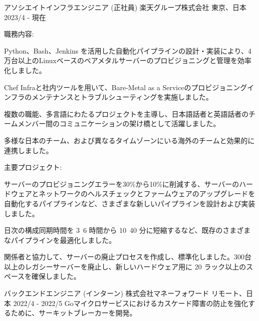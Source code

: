 

\begin{cventries}

  \cventry
    {アソシエイトインフラエンジニア (正社員)} %
    {楽天グループ株式会社} %
    {東京、日本} %
    {2023/4 - 現在} %
    {
        職務内容:
        \begin{cvbullets}
        \item Python、Bash、Jenkins を活用した自動化パイプラインの設計・実装により、4万台以上のLinuxベースのベアメタルサーバーのプロビジョニングと管理を効率化しました。
        \item Chef Infraと社内ツールを用いて、Bare-Metal as a Serviceのプロビジョニングインフラのメンテナンスとトラブルシューティングを実施しました。
        \item 複数の職能、多言語にわたるプロジェクトを主導し、日本語話者と英語話者のチームメンバー間のコミュニケーションの架け橋として活躍しました。
        \item 多様な日本のチーム、および異なるタイムゾーンにいる海外のチームと効果的に連携しました。
        \end{cvbullets}
        主要プロジェクト:
        \begin{cvbullets}
        \item サーバーのプロビジョニングエラーを30\%から10\%に削減する、サーバーのハードウェアとネットワークのヘルスチェックとファームウェアのアップグレードを自動化するパイプラインなど、さまざまな新しいパイプラインを設計および実装しました。
        \item 日次の構成同期時間を 3~6 時間から 10~40 分に短縮するなど、既存のさまざまなパイプラインを最適化しました。
        \item 関係者と協力して、サーバーの廃止プロセスを作成し、標準化しました。300台以上のレガシーサーバーを廃止し、新しいハードウェア用に 20 ラック以上のスペースを確保しました。
        \end{cvbullets}
    }

  \cventry
    {バックエンドエンジニア (インターン)} %
    {株式会社マネーフォワード} %
    {リモート、日本} %
    {2022/4 - 2022/5} %
    {
        Goマイクロサービスにおけるカスケード障害の防止を強化するために、サーキットブレーカーを開発。
    }


\end{cventries}
